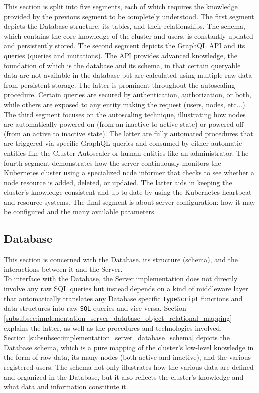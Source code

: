This section is split into five segments, each of which requires the knowledge
provided by the previous segment to be completely understood. The first segment depicts
the Database structure, its tables, and their relationships. The schema, which contains
the core knowledge of the cluster and users, is constantly updated and
persistently stored. The second segment depicts the GraphQL API and its queries (queries
and mutations). The API provides advanced knowledge, the foundation of which is the
database and its schema, in that certain queryable data are not available in the
database but are calculated using multiple raw data from persistent storage. The
latter is prominent throughout the autoscaling procedure. Certain queries are
secured by authentication, authorization, or both, while others are exposed to any
entity making the request (users, nodes, etc...). The third segment focuses on the
autoscaling technique, illustrating how nodes are automatically powered on (from
an inactive to active state) or powered off (from an active to inactive state). The
latter are fully automated procedures that are triggered via specific GraphQL queries
and consumed by either automatic entities like the Cluster Autoscaler or human entities
like an administrator. The fourth segment demonstrates how the server
continuously monitors the Kubernetes cluster using a specialized node informer
that checks to see whether a node resource is added, deleted, or updated. The latter
aids in keeping the cluster's knowledge consistent and up to date by using the Kubernetes
heartbeat and resource systems. The final segment is about server configuration:
how it may be configured and the many available parameters.

\subsection{Database}
\label{subsec:implementation_server_database}

This section is concerned with the Database, its structure (schema), and the
interactions between it and the Server. \\ %
To interface with the Database, the Server implementation does not directly involve
any raw SQL queries but instead depends on a kind of middleware layer that automatically
translates any Database specific \texttt{TypeScript} functions and data
structures into raw \texttt{SQL} queries and vice versa. Section
\ref{subsubsec:implementation_server_database_object_relational_mapping}
explains the latter, as well as the procedures and technologies involved. \\ %
Section \ref{subsubsec:implementation_server_database_schema} depicts the Database
schema, which is a pure mapping of the cluster's low-level knowledge in the form
of raw data, its many nodes (both active and inactive), and the various
registered users. The schema not only illustrates how the various data are defined
and organized in the Database, but it also reflects the cluster's knowledge and
what data and information constitute it.

